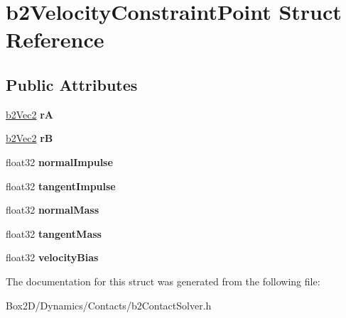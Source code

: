 \hypertarget{structb2_velocity_constraint_point}{}\section{b2\+Velocity\+Constraint\+Point Struct Reference}
\label{structb2_velocity_constraint_point}
\subsection*{Public Attributes}
\begin{DoxyCompactItemize}
\item 
\mbox{\label{structb2_velocity_constraint_point_a0be704259cd5d3902d8581e186546e5e}} 
\hyperlink{structb2_vec2}{b2\+Vec2} {\bfseries rA}
\item 
\mbox{\label{structb2_velocity_constraint_point_ab5d1c98e09e2f859b71f6d0fda46c0d5}} 
\hyperlink{structb2_vec2}{b2\+Vec2} {\bfseries rB}
\item 
\mbox{\label{structb2_velocity_constraint_point_a304653be2ca1c1daa72d7b7868b37b11}} 
float32 {\bfseries normal\+Impulse}
\item 
\mbox{\label{structb2_velocity_constraint_point_ac3e3be335d204bb6a89a7303831cc89b}} 
float32 {\bfseries tangent\+Impulse}
\item 
\mbox{\label{structb2_velocity_constraint_point_a5997e9781cedbd86333a84a967b59c33}} 
float32 {\bfseries normal\+Mass}
\item 
\mbox{\label{structb2_velocity_constraint_point_a029692226a637f5e687022041b25043c}} 
float32 {\bfseries tangent\+Mass}
\item 
\mbox{\label{structb2_velocity_constraint_point_a81d492345d9b1c8f51ec10154ab840f2}} 
float32 {\bfseries velocity\+Bias}
\end{DoxyCompactItemize}


The documentation for this struct was generated from the following file\+:\begin{DoxyCompactItemize}
\item 
Box2\+D/\+Dynamics/\+Contacts/b2\+Contact\+Solver.\+h\end{DoxyCompactItemize}
